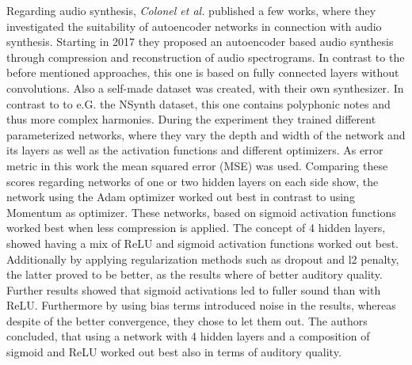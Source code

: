 Regarding audio synthesis, \textit{Colonel et al.} published a few works, where they investigated the suitability of autoencoder networks in connection with audio synthesis. \cite{colonel2017improving, colonel2018autoencoding, Colonel2020} Starting in 2017 they proposed an autoencoder based audio synthesis through compression and reconstruction of audio spectrograms. \cite{colonel2017improving} In contrast to the before mentioned approaches, this one is based on fully connected layers without convolutions. Also a self-made dataset was created, with their own synthesizer. In contrast to to e.G. the NSynth dataset, this one contains polyphonic notes and thus more complex harmonies. During the experiment they trained different parameterized networks, where they vary the depth and width of the network and its layers as well as the activation functions and different optimizers. As error metric in this work the mean squared error (MSE) was used. Comparing these scores regarding networks of one or two hidden layers on each side show, the network using the Adam optimizer worked out best in contrast to using Momentum as optimizer. These networks, based on sigmoid activation functions worked best when less compression is applied. The concept of 4 hidden layers, showed having a mix of ReLU and sigmoid activation functions worked out best. Additionally by applying regularization methods such as dropout and l2 penalty, the latter proved to be better, as the results where of better auditory quality. Further results showed that sigmoid activations led to fuller sound than with ReLU. Furthermore by using bias terms introduced noise in the results, whereas despite of the better convergence, they chose to let them out. The authors concluded, that using a network with 4 hidden layers and a composition of sigmoid and ReLU worked out best also in terms of auditory quality.\\

